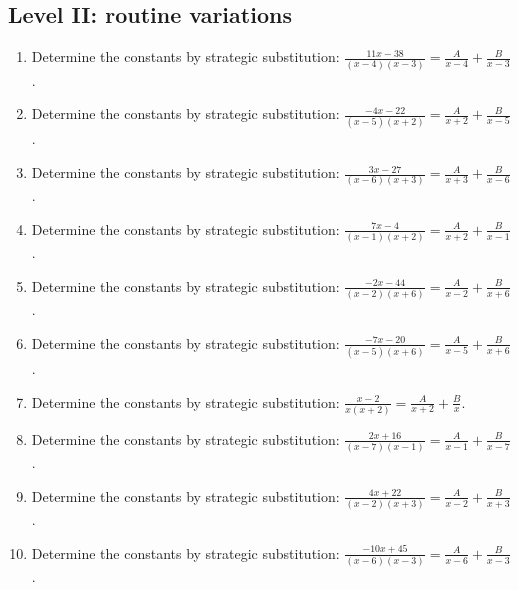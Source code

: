 \documentclass[11pt,oneside]{book}
\begin{document}
\subsection*{Level II: routine variations}
\begin{enumerate}[leftmargin=*,label=\textbf{\arabic*.},itemsep=0.65\baselineskip]
\item Determine the constants by strategic substitution: $\displaystyle \frac{11 x - 38}{\left(x - 4\right) \left(x - 3\right)}=\frac{A}{x - 4} + \frac{B}{x - 3}$.
\item Determine the constants by strategic substitution: $\displaystyle \frac{- 4 x - 22}{\left(x - 5\right) \left(x + 2\right)}=\frac{A}{x + 2} + \frac{B}{x - 5}$.
\item Determine the constants by strategic substitution: $\displaystyle \frac{3 x - 27}{\left(x - 6\right) \left(x + 3\right)}=\frac{A}{x + 3} + \frac{B}{x - 6}$.
\item Determine the constants by strategic substitution: $\displaystyle \frac{7 x - 4}{\left(x - 1\right) \left(x + 2\right)}=\frac{A}{x + 2} + \frac{B}{x - 1}$.
\item Determine the constants by strategic substitution: $\displaystyle \frac{- 2 x - 44}{\left(x - 2\right) \left(x + 6\right)}=\frac{A}{x - 2} + \frac{B}{x + 6}$.
\item Determine the constants by strategic substitution: $\displaystyle \frac{- 7 x - 20}{\left(x - 5\right) \left(x + 6\right)}=\frac{A}{x - 5} + \frac{B}{x + 6}$.
\item Determine the constants by strategic substitution: $\displaystyle \frac{x - 2}{x \left(x + 2\right)}=\frac{A}{x + 2} + \frac{B}{x}$.
\item Determine the constants by strategic substitution: $\displaystyle \frac{2 x + 16}{\left(x - 7\right) \left(x - 1\right)}=\frac{A}{x - 1} + \frac{B}{x - 7}$.
\item Determine the constants by strategic substitution: $\displaystyle \frac{4 x + 22}{\left(x - 2\right) \left(x + 3\right)}=\frac{A}{x - 2} + \frac{B}{x + 3}$.
\item Determine the constants by strategic substitution: $\displaystyle \frac{- 10 x + 45}{\left(x - 6\right) \left(x - 3\right)}=\frac{A}{x - 6} + \frac{B}{x - 3}$.
\end{enumerate}
\end{document}
